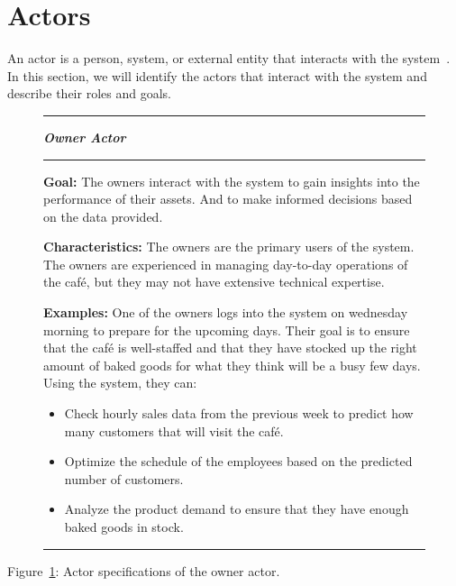 \section{Actors}\label{sec:actors}
An actor is a person, system, or external entity that interacts with the system~\cite{mathiassen2018}.
In this section, we will identify the actors that interact with the system and describe their roles and goals.

\begin{figure}[H]
    \noindent
    \rule{\textwidth}{0.4pt}
    \begin{center}
    \noindent
    \textit{\textbf{Owner Actor}}
    \end{center}

    \noindent
    \rule{\textwidth}{0.4pt}

    \noindent
    \textbf{Goal:} The owners interact with the system to gain insights into the performance of their assets.
    And to make informed decisions based on the data provided.
    \newline

    \noindent
    \textbf{Characteristics:} The owners are the primary users of the system.
    The owners are experienced in managing day-to-day operations of the café, but they may not have extensive technical
    expertise.
    \newline

    \noindent
    \textbf{Examples:} One of the owners logs into the system on wednesday morning to prepare for the upcoming days.
    Their goal is to ensure that the café is well-staffed and that they have stocked up the right amount of baked goods
    for what they think will be a busy few days.
    Using the system, they can:
    
    \begin{itemize}
        \item Check hourly sales data from the previous week to predict how many customers that will
        visit the café.
        \item Optimize the schedule of the employees based on the predicted number of customers.
        \item Analyze the product demand to ensure that they have enough baked goods in stock.
    \end{itemize}
    \noindent
    \rule{\textwidth}{0.4pt}
    \label{fig:actor-owner}
\end{figure}

Figure~\ref{fig:actor-owner}: Actor specifications of the owner actor.

